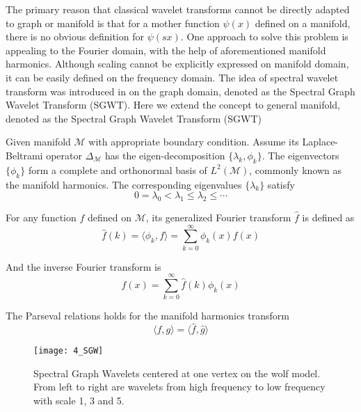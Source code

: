 The primary reason that classical wavelet transforms cannot be directly adapted to graph or manifold is
that for a mother function $\psi(x)$ defined on a manifold,
there is no obvious definition for $\psi(sx)$. One approach to solve this problem is appealing to the Fourier domain,
with the help of aforementioned manifold harmonics. Although scaling cannot be explicitly expressed on manifold domain,
it can be easily defined on the frequency domain. The idea of spectral wavelet transform was introduced in \cite{Hammond2011}
on the graph domain, denoted as the Spectral Graph Wavelet Transform (SGWT). Here we extend the concept to general manifold,
denoted as the Spectral Graph Wavelet Transform (SGWT)

Given manifold $\mathcal{M}$ with appropriate boundary condition. Assume its Laplace-Beltrami operator $\Delta_\mathcal{M}$ has the eigen-decomposition $\{\lambda_k,\phi_k\}$. The eigenvectors $\{\phi_k\}$ form a complete and orthonormal basis of $L^2(\mathcal{M})$, commonly known as the manifold harmonics. The corresponding eigenvalues $\{\lambda_k\}$ satisfy
\begin{equation}
0=\lambda_0 < \lambda_1 \leq \lambda_2 \leq \cdots
\end{equation}

For any function $f$ defined on $\mathcal{M}$, its generalized Fourier transform $\hat{f}$ is defined as
\begin{equation}
\hat{f}(k)=\langle \phi_k, f \rangle=\sum_{k=0}^\infty \phi_k(x)f(x)
\end{equation}

And the inverse Fourier transform is
\begin{equation}
f(x)=\sum_{k=0}^\infty\hat{f}(k)\phi_k(x)
\end{equation}

The Parseval relations holds for the manifold harmonics transform
\begin{equation}
\label{eq:parseval}
\langle f,g\rangle=\langle\hat{f},\hat{g}\rangle
\end{equation}

\begin{figure}[!to]
\begin{center}
\texttt{[image: 4\_SGW]}
\end{center}
\caption[Spectral graph wavelets on the wolf model.]{Spectral Graph Wavelets centered at one vertex on the wolf model.
  From left to right are wavelets from high frequency to low frequency with
  scale 1, 3 and 5.}
\label{SGW}
\end{figure}

